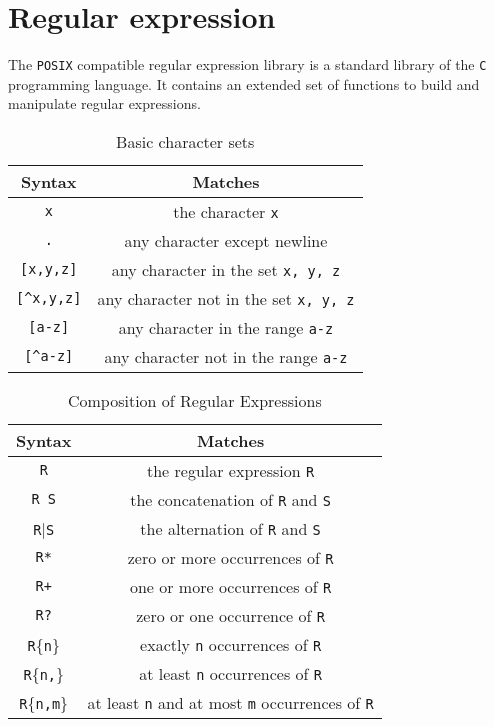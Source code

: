 \section{Regular expression}

The \texttt{POSIX} compatible regular expression library is a standard library of the \texttt{C} programming language.
It contains an extended set of functions to build and manipulate regular expressions.
\begin{table}[H]
  \centering
  \begin{tabular}{c|c}
    \textbf{Syntax}                   & \textbf{Matches}                              \\ \hline
    \texttt{x}                        & the character \texttt{x}                      \\
    \texttt{.}                        & any character except newline                  \\
    \texttt{[x,y,z]}                  & any character in the set \texttt{x, y, z}     \\
    \texttt{[\textasciicircum x,y,z]} & any character not in the set \texttt{x, y, z} \\
    \texttt{[a-z]}                    & any character in the range \texttt{a-z}       \\
    \texttt{[\textasciicircum a-z]}   & any character not in the range \texttt{a-z}   \\
  \end{tabular}
  \caption{Basic character sets}
\end{table}
\begin{table}[H]
  \centering
  \begin{tabular}{c|c}
    \textbf{Syntax}           & \textbf{Matches}                                                     \\ \hline
    \texttt{R}                & the regular expression \texttt{R}                                    \\
    \texttt{R S}              & the concatenation of \texttt{R} and \texttt{S}                       \\
    \texttt{R}|\texttt{S}     & the alternation of \texttt{R} and \texttt{S}                         \\
    \texttt{R*}               & zero or more occurrences of \texttt{R}                               \\
    \texttt{R+}               & one or more occurrences of \texttt{R}                                \\
    \texttt{R?}               & zero or one occurrence of \texttt{R}                                 \\
    \texttt{R}\{\texttt{n}\}  & exactly \texttt{n} occurrences of \texttt{R}                         \\
    \texttt{R}\{\texttt{n,}\} & at least \texttt{n} occurrences of \texttt{R}                        \\
    \texttt{R}\{\texttt{n,m}\}& at least \texttt{n} and at most \texttt{m} occurrences of \texttt{R} \\
  \end{tabular}
  \caption{Composition of Regular Expressions}
\end{table}
